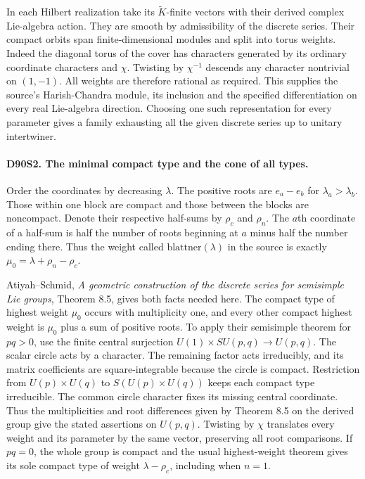 In each Hilbert realization take its $\widetilde K$-finite vectors
with their derived complex Lie-algebra action. They are smooth by
admissibility of the discrete series. Their compact orbits span
finite-dimensional modules and split into torus weights. Indeed
the diagonal torus of the cover has characters generated by its
ordinary coordinate characters and $\chi$. Twisting by $\chi^{-1}$
descends any character nontrivial on $(1,-1)$. All weights are
therefore rational as required. This supplies the source's
Harish-Chandra module, its inclusion and the specified differentiation
on every real Lie-algebra direction. Choosing one such representation
for every parameter gives a family exhausting all the given discrete
series up to unitary intertwiner.

\paragraph{D90S2. The minimal compact type and the cone of all types.}
Order the coordinates by decreasing $\lambda$. The positive roots
are $e_a-e_b$ for $\lambda_a>\lambda_b$. Those within one block
are compact and those between the blocks are noncompact. Denote
their respective half-sums by $\rho_c$ and $\rho_n$. The $a$th
coordinate of a half-sum is half the number of roots beginning at
$a$ minus half the number ending there. Thus the weight called
$\mathrm{blattner}(\lambda)$ in the source is exactly
$\mu_0=\lambda+\rho_n-\rho_c$.

Atiyah--Schmid, \emph{A geometric construction of the discrete
series for semisimple Lie groups}, Theorem 8.5, gives both facts
needed here. The compact type of highest weight $\mu_0$ occurs
with multiplicity one, and every other compact highest weight is
$\mu_0$ plus a sum of positive roots. To apply their semisimple
theorem for $pq>0$, use the finite central surjection
$U(1)\times SU(p,q)\to U(p,q)$. The scalar circle acts by a
character. The remaining factor acts irreducibly, and its matrix
coefficients are square-integrable because the circle is compact.
Restriction from $U(p)\times U(q)$ to $S(U(p)\times U(q))$
keeps each compact type irreducible. The common circle character
fixes its missing central coordinate. Thus the multiplicities and
root differences given by Theorem 8.5 on the derived group give the
stated assertions on $U(p,q)$. Twisting by $\chi$ translates
every weight and its parameter by the same vector, preserving all
root comparisons. If $pq=0$, the whole group is compact and the
usual highest-weight theorem gives its sole compact type of weight
$\lambda-\rho_c$, including when $n=1$.

